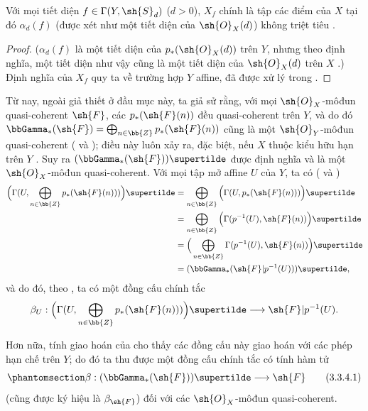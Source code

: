 \documentclass[oneside,10pt]{amsart}
\makeatletter
\newcommand{\ega@arrow}[2]{\mathchoice{#1}{#2}{#2}{#2}}
\renewcommand{\to}{\ega@arrow{\longrightarrow}{\rightarrow}}
\let\EGAOriginalLabel\label
\renewcommand{\label}[1]{\phantomsection\EGAOriginalLabel{#1}}
\makeatother
\begin{document}
\begin{proposition}[3.3.3]
\label{II.3.3.3}
Với mọi tiết diện $f\in\Gamma(Y,\sh{S}_d)$ ($d>0$), $X_f$ chính là tập các điểm của $X$ tại đó $\alpha_d(f)$ (được xét như một tiết diện của $\sh{O}_X(d)$) không triệt tiêu .
\end{proposition}

\begin{proof}
($\alpha_d(f)$ là một tiết diện của $p_*(\sh{O}_X(d))$ trên $Y$, nhưng theo định nghĩa, một tiết diện như vậy cũng là một tiết diện của $\sh{O}_X(d)$ trên $X$ .)
Định nghĩa của $X_f$  quy ta về trường hợp $Y$ affine, đã được xử lý trong .
\end{proof}

\begin{env}[3.3.4]
\label{II.3.3.4}
Từ nay, ngoài giả thiết ở đầu mục này, ta giả sử rằng, với mọi $\sh{O}_X$-môđun quasi-coherent $\sh{F}$, các $p_*(\sh{F}(n))$ đều quasi-coherent trên $Y$, và do đó $\bbGamma_*(\sh{F})=\bigoplus_{n\in\bb{Z}}p_*(\sh{F}(n))$ cũng là một $\sh{O}_Y$-môđun quasi-coherent ( và );
điều này luôn xảy ra, đặc biệt, nếu $X$ thuộc kiểu hữu hạn trên $Y$ .
Suy ra $(\bbGamma_*(\sh{F}))\supertilde$ được định nghĩa và là một $\sh{O}_X$-môđun quasi-coherent.
Với mọi tập mở affine $U$ của $Y$, ta có ( và )
\begin{align*}
  \Big(\Gamma(U,\bigoplus_{n\in\bb{Z}}p_*(\sh{F}(n)))\Big)\supertilde
  &=\bigoplus_{n\in\bb{Z}}\Big(\Gamma(U,p_*(\sh{F}(n)))\Big)\supertilde
\\&=\bigoplus_{n\in\bb{Z}}\Big(\Gamma(p^{-1}(U),\sh{F}(n))\Big)\supertilde
\\&=\Big(\bigoplus_{n\in\bb{Z}}\Gamma(p^{-1}(U),\sh{F}(n))\Big)\supertilde
\\&=(\bbGamma_*(\sh{F}|p^{-1}(U)))\supertilde,
\end{align*}
và do đó, theo , ta có một đồng cấu chính tắc
\[
  \beta_U:\Big(\Gamma(U,\bigoplus_{n\in\bb{Z}}p_*(\sh{F}(n)))\Big)\supertilde\to\sh{F}|p^{-1}(U).
\]

Hơn nữa, tính giao hoán của  cho thấy các đồng cấu này giao hoán với các phép hạn chế trên $Y$;
do đó ta thu được một đồng cấu chính tắc có tính hàm tử
\[
\label{II.3.3.4.1}
  \beta:(\bbGamma_*(\sh{F}))\supertilde\to\sh{F}
\tag{3.3.4.1}
\]
(cũng được ký hiệu là $\beta_{\sh{F}}$) đối với các $\sh{O}_X$-môđun quasi-coherent.
\end{env}
\end{document}
